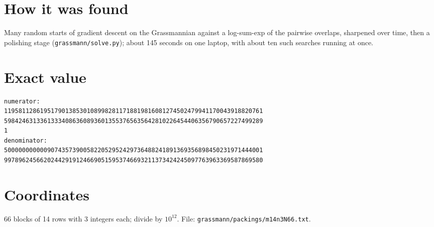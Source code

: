 \documentclass[11pt,a4paper]{article}
\begin{document}
\section{How it was found}
Many random starts of gradient descent on the Grassmannian against a log-sum-exp of the pairwise overlaps, sharpened over time, then a polishing stage (\texttt{grassmann/solve.py}); about 145 seconds on one laptop, with about ten such searches running at once.


\appendix
\section{Exact value}
{\small
\begin{verbatim}
numerator:
119581128619517901385301089982811718819816081274502479941170043918820761
598424631336133340863608936013553765635642810226454406356790657227499289
1
denominator:
500000000000907435739005822052952429736488241891369356898450231971444001
997896245662024429191246690515953746693211373424245097763963369587869580
\end{verbatim}}

\section{Coordinates}
66 blocks of 14 rows with 3 integers each; divide by $10^{12}$. File: \texttt{grassmann/packings/m14n3N66.txt}.
{\tiny
\begin{multicols}{3}
\end{multicols}}
\end{document}
